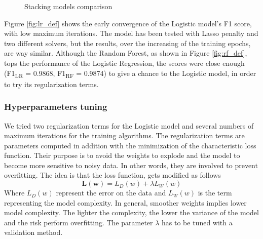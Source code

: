 \begin{figure}[htp!]
	\centering 
	\caption{Stacking models comparison}
\end{figure}

Figure \ref{fig:lr_def} shows the early convergence of the Logistic model's F1 score, with low maximum iterations. The model has been tested with Lasso penalty and two different solvers, but the results, over the increasing of the training epochs, are way similar.
Although the Random Forest, as shown in Figure \ref{fig:rf_def}, tops the performance of the Logistic Regression, the scores were close enough (F1\textsubscript{LR} = 0.9868,  F1\textsubscript{RF} = 0.9874) to give a chance to the Logistic model, in order to try its regularization terms.

\subsubsection{Hyperparameters tuning}
We tried two regularization terms for the Logistic model and several numbers of maximum iterations for the training algorithms.
The regularization terms are parameters computed in addition with the minimization of the characteristic loss function. Their purpose is to avoid the weights to explode and the model to become more sensitive to noisy data. In other words, they are involved to prevent overfitting.
The idea is that the loss function, gets modified as follows
\[ \mathbf{L(w)} = L_{D}(w) + \lambda L_{W}(w)\]
Where $ L_{D}(w)  $ represent the error on the data and $ L_{W}(w)  $ is the term representing the model complexity. In general, smoother weights implies lower model complexity. The lighter the complexity, the lower the variance of the model and the risk perform overfitting.
The parameter $ \mathit{\lambda} $ has to be tuned with a validation method.

